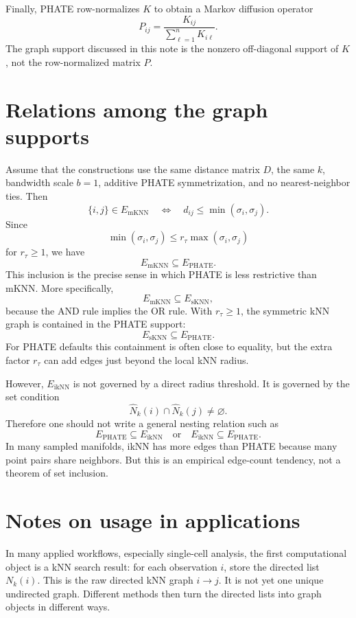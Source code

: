 \documentclass[11pt]{article}
\begin{document}
Finally, PHATE row-normalizes \(K\) to obtain a Markov diffusion operator
\[
  P_{ij}=\frac{K_{ij}}{\sum_{\ell=1}^n K_{i\ell}}.
\]
The graph support discussed in this note is the nonzero off-diagonal support of \(K\), not
the row-normalized matrix \(P\).

\section{Relations among the graph supports}

Assume that the constructions use the same distance matrix \(D\), the same \(k\),
bandwidth scale \(b=1\), additive PHATE symmetrization, and no nearest-neighbor ties.
Then
\[
  \{i,j\}\in E_{\mathrm{mKNN}}
  \quad\Longleftrightarrow\quad
  d_{ij}\le \min(\sigma_i,\sigma_j).
\]
Since
\[
  \min(\sigma_i,\sigma_j)
  \le
  r_\tau \max(\sigma_i,\sigma_j)
\]
for \(r_\tau\ge 1\), we have
\[
  E_{\mathrm{mKNN}}\subseteq E_{\mathrm{PHATE}}.
\]
This inclusion is the precise sense in which PHATE is less restrictive than mKNN.
More specifically,
\[
  E_{\mathrm{mKNN}}\subseteq E_{\mathrm{sKNN}},
\]
because the AND rule implies the OR rule.  With \(r_\tau\ge 1\), the symmetric kNN graph is
contained in the PHATE support:
\[
  E_{\mathrm{sKNN}}\subseteq E_{\mathrm{PHATE}}.
\]
For PHATE defaults this containment is often close to equality, but the extra factor
\(r_\tau\) can add edges just beyond the local kNN radius.

However, \(E_{\mathrm{ikNN}}\) is not governed by a direct radius threshold.  It is governed
by the set condition
\[
  \widehat{N}_k(i)\cap \widehat{N}_k(j)\ne\varnothing.
\]
Therefore one should not write a general nesting relation such as
\[
  E_{\mathrm{PHATE}}\subseteq E_{\mathrm{ikNN}}
  \quad\text{or}\quad
  E_{\mathrm{ikNN}}\subseteq E_{\mathrm{PHATE}}.
\]
In many sampled manifolds, ikNN has more edges than PHATE because many point pairs share
neighbors.  But this is an empirical edge-count tendency, not a theorem of set inclusion.

\section{Notes on usage in applications}

In many applied workflows, especially single-cell analysis, the first computational object is
a kNN search result: for each observation \(i\), store the directed list \(N_k(i)\).  This is
the raw directed kNN graph \(i\to j\).  It is not yet one unique undirected graph.  Different
methods then turn the directed lists into graph objects in different ways.
\end{document}
